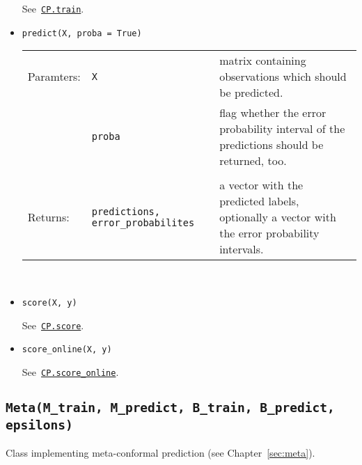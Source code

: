 \documentclass[twoside,11pt]{article}
\def\wo{~\\}
\begin{document}
\begin{appendices}
\begin{itemize}
          See~\hyperref[itm:cp_train]
          {\texttt{CP.train}}.
          \\

        \item
          \texttt{predict(X, proba = True)}
          \label{itm:cp_predict}

          \begin{tabu}{lp{4cm}X}
            Paramters: &\texttt{X}
                       &matrix containing observations
                        which should be predicted.
                        \\
                       &\texttt{proba}
                       &flag whether the error probability
                        interval of the predictions should
                        be returned, too.
                        \\\\
            Returns:   &\texttt{predictions,
                                error\_probabilites}
                       &a vector with the predicted labels,
                        optionally a vector with the
                        error probability intervals.
          \end{tabu}
          \wo

        \item
          \texttt{score(X, y)}

          See~\hyperref[itm:cp_score]
          {\texttt{CP.score}}.
          \\

        \item
          \texttt{score\_online(X, y)}

          See~\hyperref[itm:cp_score_online]
          {\texttt{CP.score\_online}}.

      \end{itemize}

    \subsection*{\texttt{Meta(M\_train, M\_predict,
                 B\_train, B\_predict, epsilons)}}

      Class implementing meta-conformal prediction
      (see Chapter~\ref{sec:meta}).
      \\


\end{appendices}
\end{document}
